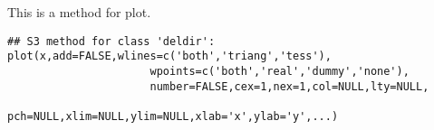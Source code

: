 \begin{Description}\relax
This is a method for plot.
\end{Description}
\begin{Usage}
\begin{verbatim}
## S3 method for class 'deldir':
plot(x,add=FALSE,wlines=c('both','triang','tess'),
                      wpoints=c('both','real','dummy','none'),
                      number=FALSE,cex=1,nex=1,col=NULL,lty=NULL,
                      pch=NULL,xlim=NULL,ylim=NULL,xlab='x',ylab='y',...)

\end{verbatim}
\end{Usage}
